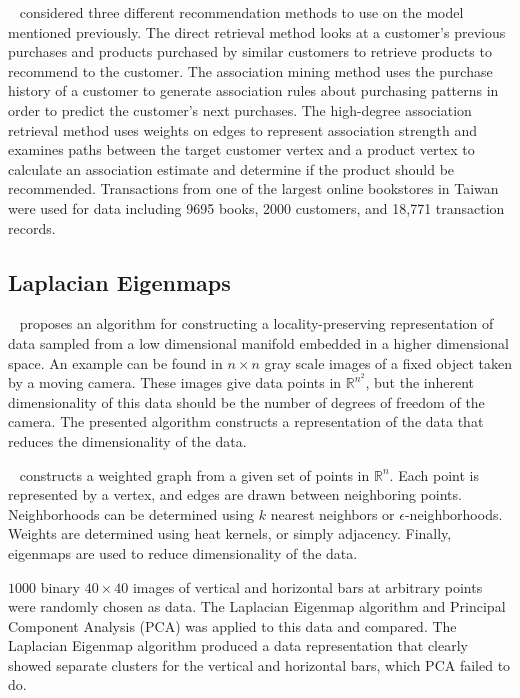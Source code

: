 ~\cite{huang2004graph} considered three different recommendation methods to use on the model mentioned previously. The direct retrieval method looks at a customer's previous purchases and products purchased by similar customers to retrieve products to recommend to the customer. The association mining method uses the purchase history of a customer to generate association rules about purchasing patterns in order to predict the customer's next purchases. The high-degree association retrieval method uses weights on edges to represent association strength and examines paths between the target customer vertex and a product vertex to calculate an association estimate and determine if the product should be recommended. Transactions from one of the largest online bookstores in Taiwan were used for data including 9695 books, 2000 customers, and 18,771 transaction records.


\subsection{Laplacian Eigenmaps}
~\cite{belkin2002laplacian} proposes an algorithm for constructing a locality-preserving representation of data sampled from a low dimensional manifold embedded in a higher dimensional space. An example can be found in $n\times n$ gray scale images of a fixed object taken by a moving camera. These images give data points in $\mathbb{R}^{n^{2}}$, but the inherent dimensionality of this data should be the number of degrees of freedom of the camera. The presented algorithm constructs a representation of the data that reduces the dimensionality of the data.

~\cite{belkin2002laplacian} constructs a weighted graph from a given set of points in $\mathbb{R}^{n}$. Each point is represented by a vertex, and edges are drawn between neighboring points. Neighborhoods can be determined using $k$ nearest neighbors or $\epsilon$-neighborhoods. Weights are determined using heat kernels, or simply adjacency. Finally, eigenmaps are used to reduce dimensionality of the data.

$1000$ binary $40 \times 40$ images of vertical and horizontal bars at arbitrary points were randomly chosen as data. The Laplacian Eigenmap algorithm and Principal Component Analysis (PCA) was applied to this data and compared. The Laplacian Eigenmap algorithm produced a data representation that clearly showed separate clusters for the vertical and horizontal bars, which PCA failed to do.
